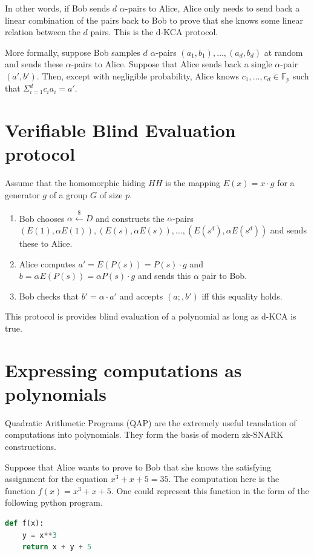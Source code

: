\documentclass[twoside]{article}
\begin{document}
In other words, if Bob sends $d$ $\alpha$-pairs to Alice, Alice only needs to send back a linear combination of the pairs back to Bob 
to prove that she knows some linear relation between the $d$ pairs. This is the d-KCA protocol. 

More formally, suppose Bob samples $d$ $\alpha$-pairs $(a_1, b_1), \ldots, (a_d, b_d)$ at random and sends these $\alpha$-pairs to Alice.
Suppose that Alice sends back a single $\alpha$-pair $(a', b')$. Then, except with negligible probability, Alice knows 
$c_1, \ldots, c_d \in \mathbb{F}_p$ such that $\Sigma_{i=1}^{d} c_ia_i = a'$.


\section{Verifiable Blind Evaluation protocol}
Assume that the homomorphic hiding $HH$ is the mapping $E(x) = x \cdot g$ for a generator $g$ of a group $G$ of size $p$.
\begin{enumerate}
\item Bob chooses $\alpha \xleftarrow{\$} D$ and constructs the $\alpha$-pairs 
$(E(1), \alpha E(1)), (E(s), \alpha E(s)), \ldots, (E(s^d), \alpha E(s^d))$ and sends these to Alice.
\item Alice computes $a' = E(P(s)) = P(s) \cdot g$ and $b = \alpha E(P(s)) = \alpha P(s) \cdot g$ and sends this $\alpha$ pair
to Bob.
\item Bob checks that $b' = \alpha \cdot a'$ and accepts $(a;, b')$ iff this equality holds.
\end{enumerate}

This protocol is provides blind evaluation of a polynomial as long as d-KCA is true.

\section{Expressing computations as polynomials}
Quadratic Arithmetic Programs (QAP) are the extremely useful translation of computations into polynomials. They form the basis
of modern zk-SNARK constructions.

Suppose that Alice wants to prove to Bob that she knows the satisfying assignment for the equation $x^3 + x + 5 = 35$. 
The computation here is the function $f(x) = x^3 + x + 5$. One could represent this function in the form of the following 
python program.
\begin{lstlisting}[language=Python]
def f(x):
    y = x**3
    return x + y + 5
\end{lstlisting}
\end{document}
